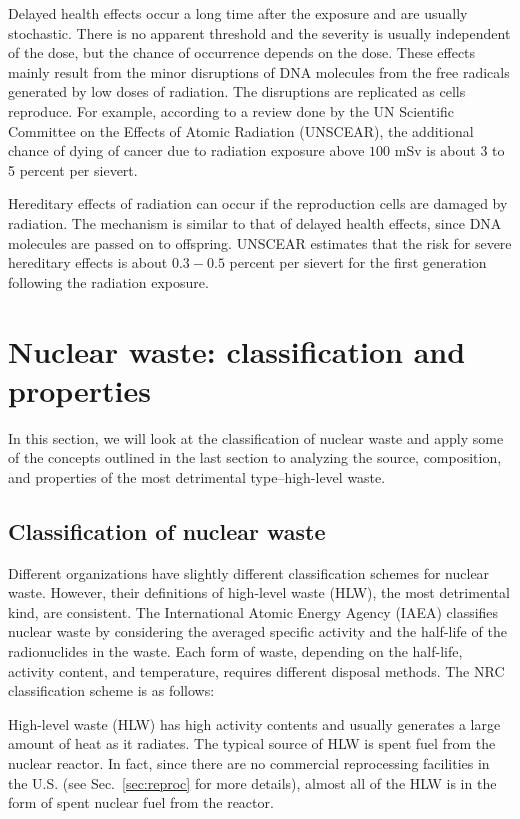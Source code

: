 \documentclass[nofootinbib,preprint,aps]{revtex4-1}
\begin{document}
        Delayed health effects occur a long time after the exposure and are usually stochastic. There is
        no apparent threshold and the severity is usually independent of the dose, but
        the chance of occurrence depends on the dose.\cite{u16}
        These effects mainly result from the minor disruptions of DNA molecules from the free radicals generated
        by low doses of radiation. The disruptions are replicated
        as cells reproduce.
        For example, according to a review done by the UN Scientific Committee on the Effects of Atomic Radiation
        (UNSCEAR), the additional chance of dying of cancer due to radiation exposure above $100$ mSv is
        about 3 to 5 percent per sievert.\cite{unscear16}

        Hereditary effects of radiation can occur if the reproduction cells are damaged by radiation.
        The mechanism is similar to that of delayed health effects, since DNA molecules are passed on
        to offspring.
        UNSCEAR estimates that the risk for severe hereditary effects is about $0.3-0.5$ percent per sievert for 
        the first generation following the radiation exposure.\cite{u16, unscear16}
\section{Nuclear waste: classification and properties}
\label{sec:waste}
    In this section, we will look at the classification of nuclear waste and
    apply some of the concepts outlined in the last section to 
    analyzing the source, composition, and properties of the most detrimental type--high-level waste.
    \subsection{Classification of nuclear waste}
    \label{sec:waste:classification}
    Different organizations have slightly different classification schemes for nuclear waste.
    However, their definitions of high-level waste (HLW), the most detrimental kind, are consistent.
    The International Atomic Energy Agency (IAEA) classifies nuclear waste by considering the averaged specific activity
    and the half-life of the radionuclides in the waste.\cite{iaea09}
    Each form of waste, depending on the half-life, activity content, and temperature, requires different
    disposal methods. The NRC classification scheme is as follows:\cite{nrc09}

    High-level waste (HLW) has high activity contents and usually generates a large amount of
    heat as it radiates. The typical source of HLW is spent fuel from the nuclear reactor.
    In fact, since there are no commercial reprocessing facilities in the U.S. (see Sec.~\ref{sec:reproc} for
    more details),
    almost all of the HLW is in the form of spent nuclear fuel from the reactor.
\end{document}
